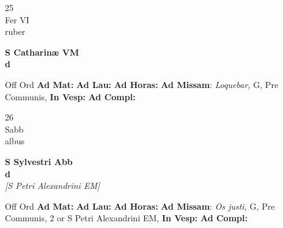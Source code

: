 \documentclass[10pt, openany]{book}
\begin{document}
        \begin{center}
            \begin{minipage}{3.5in}
                \vspace{2em}
                \begin{minipage}{0.5in}
                    {\Huge 25} \\
                    {\normalsize Fer VI} \\
                    {\normalsize ruber}
                \end{minipage}
                \begin{minipage}{3.0in}
                    \textbf{ \large S Catharinæ VM \\
                    \textnormal{\normalsize d}} \\ 
                \end{minipage}
                \begin{justify}Off Ord
                    \textbf{Ad Mat: }
                    \textbf{Ad Lau: }
                    \textbf{Ad Horas: }\textbf{Ad Missam}: \textit{Loquebar,} G, Pre Communis,  
                    \textbf{In Vesp: }
                    \textbf{Ad Compl: }
                \end{justify}
            \end{minipage}
        \end{center}
    
        \begin{center}
            \begin{minipage}{3.5in}
                \vspace{2em}
                \begin{minipage}{0.5in}
                    {\Huge 26} \\
                    {\normalsize Sabb} \\
                    {\normalsize albus}
                \end{minipage}
                \begin{minipage}{3.0in}
                    \textbf{ \large S Sylvestri Abb \\
                    \textnormal{\normalsize d}} \\ \textit{[S Petri Alexandrini EM]} \\ 
                \end{minipage}
                \begin{justify}Off Ord
                    \textbf{Ad Mat: }
                    \textbf{Ad Lau: }
                    \textbf{Ad Horas: }\textbf{Ad Missam}: \textit{Os justi,} G, Pre Communis, 2 or S Petri Alexandrini EM,  
                    \textbf{In Vesp: }
                    \textbf{Ad Compl: }
                \end{justify}
            \end{minipage}
        \end{center}
    
\end{document}
